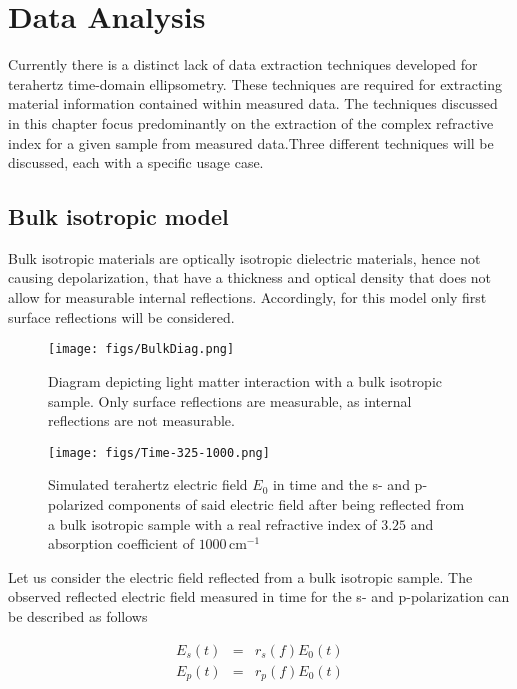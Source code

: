 \chapter{Data Analysis}
\label{chp:Analysis}

Currently there is a distinct lack of data extraction techniques developed for terahertz time-domain ellipsometry. These techniques are required for extracting material information contained within measured data. The techniques discussed in this chapter focus predominantly on the extraction of the complex refractive index for a given sample from measured data.Three different techniques will be discussed, each with a specific usage case.

\section{Bulk isotropic model}
\label{sec:BIM}
Bulk isotropic materials are optically isotropic dielectric materials, hence not causing depolarization, that have a thickness and optical density that does not allow for measurable internal reflections. Accordingly, for this model only first surface reflections will be considered.

\begin{figure}[H]
\begin{center}
	 \texttt{[image: figs/BulkDiag.png]}
	 \caption{Diagram depicting light matter interaction with a bulk isotropic sample. Only surface reflections are measurable, as internal reflections are not measurable.}
   \label{fig:BulkDiag}
\end{center}
\end{figure}

\begin{figure}[H]
\begin{center}
	 \texttt{[image: figs/Time-325-1000.png]}
	 \caption{Simulated terahertz electric field $E_{0}$ in time and the s- and p-polarized components of said electric field after being reflected from a bulk isotropic sample with a real refractive index of $3.25$ and absorption coefficient of $1000\,\mbox{cm}^{-1}$}
   \label{fig:BulkTime}
\end{center}
\end{figure}

Let us consider the electric field reflected from a bulk isotropic sample. The observed reflected electric field measured in time for the s- and p-polarization can be described as follows

\begin{eqnarray}
E_{s}(t) &=& r_{s}(f)E_{0}(t) \label{eq:Es-bulk Time}\\
E_{p}(t) &=& r_{p}(f)E_{0}(t) \label{eq:Ep-bulk Time}
\end{eqnarray}

